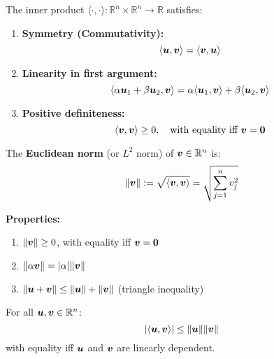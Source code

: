 \begin{theorem}
    The inner product $\langle \cdot, \cdot \rangle: \mathbb{R}^n \times \mathbb{R}^n \to \mathbb{R}$ satisfies:

    \begin{enumerate}
        \item \textbf{Symmetry (Commutativity):}
              \[
                  \langle \bm{u}, \bm{v} \rangle = \langle \bm{v}, \bm{u} \rangle
              \]

        \item \textbf{Linearity in first argument:}
              \[
                  \langle \alpha\bm{u}_1 + \beta\bm{u}_2, \bm{v} \rangle = \alpha\langle \bm{u}_1, \bm{v} \rangle + \beta\langle \bm{u}_2, \bm{v} \rangle
              \]

        \item \textbf{Positive definiteness:}
              \[
                  \langle \bm{v}, \bm{v} \rangle \geq 0, \quad \text{with equality iff } \bm{v} = \bm{0}
              \]
    \end{enumerate}
\end{theorem}

\begin{definition}
    The \textbf{Euclidean norm} (or $L^2$ norm) of $\bm{v} \in \mathbb{R}^n$ is:
    \[
        \|\bm{v}\| := \sqrt{\langle \bm{v}, \bm{v} \rangle} = \sqrt{\sum_{j=1}^{n} v_j^2}
    \]

    \textbf{Properties:}
    \begin{enumerate}
        \item $\|\bm{v}\| \geq 0$, with equality iff $\bm{v} = \bm{0}$
        \item $\|\alpha\bm{v}\| = |\alpha|\|\bm{v}\|$
        \item $\|\bm{u} + \bm{v}\| \leq \|\bm{u}\| + \|\bm{v}\|$ (triangle inequality)
    \end{enumerate}
\end{definition}

\begin{theorem}
    For all $\bm{u}, \bm{v} \in \mathbb{R}^n$:
    \[
        |\langle \bm{u}, \bm{v} \rangle| \leq \|\bm{u}\| \|\bm{v}\|
    \]
    with equality iff $\bm{u}$ and $\bm{v}$ are linearly dependent.
\end{theorem}

